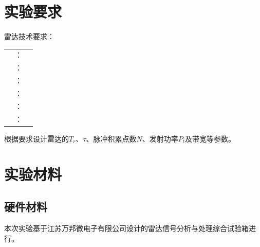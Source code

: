 \documentclass{article}
\newcounter{sub}
\begin{document}


\tableofcontents
\listoffigures
\listoftables
\listofexercises

\setcounter{section}{-1}


\newpage

\section{实验要求}%
\label{sec:实验要求}

\begin{Exercise}
	雷达技术要求：

	\begin{tabu}to.8
		 & ：&\\
		   & ：&\\
		     & ：&\\
		   & ：&\\
		   & ：&\\
		          & ：&\\
	\end{tabu}

	\kaishu 根据要求设计雷达的$ T_r $、$ \tau $、脉冲积累点数$ N $、发射功率$ P_t $及带宽等参数。

	\vspace{0mm}

\end{Exercise}

\section{实验材料}%
\label{sec:实验材料}

\subsection{硬件材料}%
\label{sub:硬件材料}

本次实验基于江苏万邦微电子有限公司设计的雷达信号分析与处理综合试验箱进行。\cite{instrument}
\end{document}
